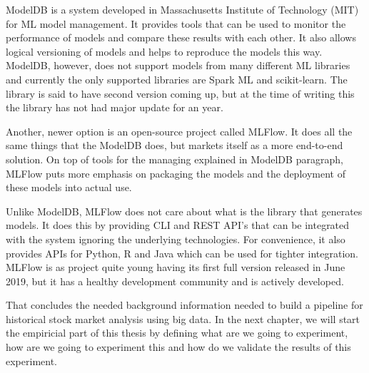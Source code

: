 ModelDB is a system developed in Massachusetts Institute of Technology (MIT) for ML model management.
It provides tools that can be used to monitor the performance of models and compare these results with each other.
It also allows logical versioning of models and helps to reproduce the models this way.
ModelDB, however, does not support models from many different ML libraries and currently the only supported libraries are Spark ML and scikit-learn.
The library is said to have second version coming up, but at the time of writing this the library has not had major update for an year.
\cite{modeldb}

Another, newer option is an open-source project called MLFlow.
It does all the same things that the ModelDB does, but markets itself as a more end-to-end solution.
On top of tools for the managing explained in ModelDB paragraph, MLFlow puts more emphasis on packaging the models and the deployment of these models into actual use.
\cite{mlflow}

Unlike ModelDB, MLFlow does not care about what is the library that generates models.
It does this by providing CLI and REST API's that can be integrated with the system ignoring the underlying technologies.
For convenience, it also provides APIs for Python, R and Java which can be used for tighter integration.
MLFlow is as project quite young having its first full version released in June 2019, but it has a healthy development community and is actively developed.
\cite{mlflow}

That concludes the needed background information needed to build a pipeline for historical stock market analysis using big data.
In the next chapter, we will start the empiricial part of this thesis by defining what are we going to experiment, how are we going to experiment this and how do we validate the results of this experiment.